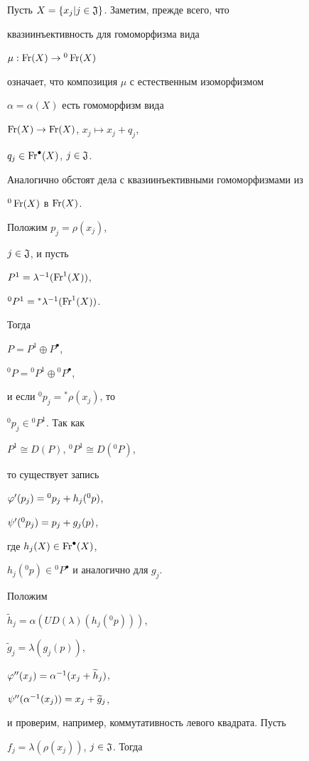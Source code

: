 \begin{pf}


Пусть $X=\{x_j|j\in{\frak J}\}$. Заметим, прежде всего, что


квазиинъективность для гомоморфизма вида


$\mu : \operatorname{Fr}(X)\to {}^0 \operatorname{Fr}(X)$


означает, что композиция $\mu$ с естественным изоморфизмом


$\alpha= \alpha(X) $ есть гомоморфизм вида


$\operatorname{Fr}(X)\to \operatorname{Fr}(X) $, $ x_j\longmapsto x_j+q_j$,


$q_j\in \operatorname{Fr}^{\bullet}(X)$, $j\in{\frak J}$.


Аналогично обстоят дела с квазиинъективными гомоморфизмами из


${}^0 \operatorname{Fr}(X)$ в $\operatorname{Fr}(X)$.


Положим $p_j=\rho(x_j)$,


$j\in{\frak J} $, и пусть


$P^1=\lambda^{-1}(\operatorname{Fr}^1(X))$,


${}^0 P^1={}^{\ast}\lambda^{-1}(\operatorname{Fr}^1(X))$.


Тогда


$P=P^1\oplus P^{\bullet}$,


${}^0 P= {}^0 P^1\oplus {}^0 P^{\bullet}$,


и если ${}^0 p_j={}^{\ast}\rho(x_j) $, то


${}^0 p_j \in {}^0 P^1$. Так как


$P^1\cong D(P)$, ${}^0 P^1 \cong D({}^0 P)$,


то существует запись


$\varphi'(p_j)={}^0 p_j+h_j({}^0 p)$,


$\psi'({}^0 p_j)=p_j+ g_j(p)$,


где $h_j(X)\in \operatorname{Fr}^{\bullet}(X)$,


$h_j({}^0 p)\in {}^0 P^{\bullet}$ и аналогично для $g_j$.





Положим


${\widetilde h}_j=\alpha(UD(\lambda)(h_j({}^0 p)))$,


${\widetilde g}_j=\lambda(g_j(p))$,


$\varphi''(x_j)=\alpha^{-1}(x_j+{\widetilde h}_j)$,


$\psi''(\alpha^{-1} (x_j))=x_j+{\widetilde g}_j$,


и проверим, например, коммутативность левого квадрата. Пусть


$f_j=\lambda(\rho(x_j))$, $j\in{\frak J} $. Тогда



\end{pf}
